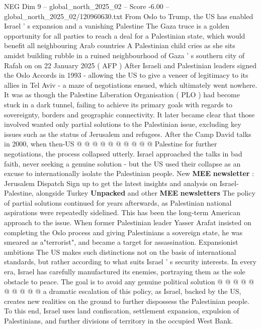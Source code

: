 \begin{textsample}{NEG Dim 9 – global\_north\_2025\_02 – Score -6.00 – global\_north\_2025\_02/120960630.txt}  \label{ex:f9_neg_016}
From Oslo to Trump, the US has enabled Israel ' s expansion and a vanishing Palestine The Gaza truce is a golden opportunity for all parties to reach a deal for a Palestinian state, which would benefit all neighbouring Arab countries A Palestinian child cries as she sits amidst building rubble in a ruined neighbourhood of Gaza ' s southern city of Rafah on on 22 January 2025 ( AFP ) After Israeli and Palestinian leaders signed the Oslo Accords in 1993 - allowing the US to give a veneer of legitimacy to its allies in Tel Aviv - a maze of negotiations ensued, which ultimately went nowhere.
It was as though the Palestine Liberation Organisation ( PLO ) had become stuck in a dark tunnel, failing to achieve its primary goals with regards to sovereignty, borders and geographic connectivity.
It later became clear that those involved wanted only partial solutions to the Palestinian issue, excluding key issues such as the status of Jerusalem and refugees.
After the Camp David talks in 2000, when then-US @ @ @ @ @ @ @ @ @ @ Palestine for further negotiations, the process collapsed utterly.
Israel approached the talks in bad faith, never seeking a genuine solution - but the US used their collapse as an excuse to internationally isolate the Palestinian people.
New \textbf{MEE} \textbf{newsletter} : Jerusalem Dispatch Sign up to get the latest insights and analysis on Israel-Palestine, alongside Turkey \textbf{Unpacked} and other \textbf{MEE} \textbf{newsletters} The policy of partial solutions continued for years afterwards, as Palestinian national aspirations were repeatedly sidelined.
This has been the long-term American approach to the issue.
When former Palestinian leader Yasser Arafat insisted on completing the Oslo process and giving Palestinians a sovereign state, he was smeared as a"terrorist", and became a target for assassination.
Expansionist ambitions The US makes such distinctions not on the basis of international standards, but rather according to what suits Israel ' s security interests.
In every era, Israel has carefully manufactured its enemies, portraying them as the sole obstacle to peace.
The goal is to avoid any genuine political solution @ @ @ @ @ @ @ @ @ @ a dramatic escalation of this policy, as Israel, backed by the US, creates new realities on the ground to further dispossess the Palestinian people.
To this end, Israel uses land confiscation, settlement expansion, expulsion of Palestinians, and further divisions of territory in the occupied West Bank.

\end{textsample}
